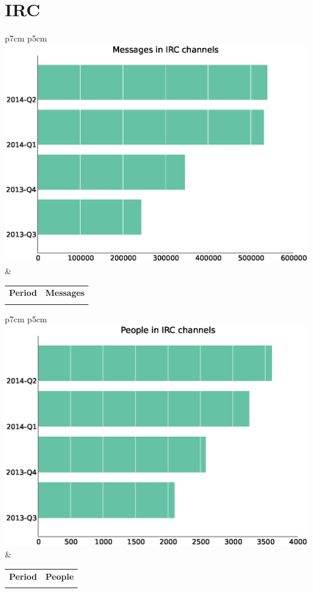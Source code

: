 \documentclass[a4wide,11pt]{report}
\begin{document}
\section{IRC}

\begin{tabular}{p{7cm} p{5cm}}
    \vspace{0pt} 
    \includegraphics[scale=.35]{figs/irc_sent.eps}
    & 
    \vspace{0pt}
    \begin{tabular}{l|l}%
    \bfseries Period & \bfseries Messages %
    \csvreader[head to column names]{data/irc_sent.csv}{}%
    {\\ & \messages}
    \end{tabular}
\end{tabular}

\begin{tabular}{p{7cm} p{5cm}}
    \vspace{0pt} 
    \includegraphics[scale=.35]{figs/irc_senders.eps}
    & 
    \vspace{0pt}
    \begin{tabular}{l|l}%
    \bfseries Period & \bfseries People %
    \csvreader[head to column names]{data/irc_senders.csv}{}%
    {\\ & \senders}
    \end{tabular}
\end{tabular}
\end{document}
